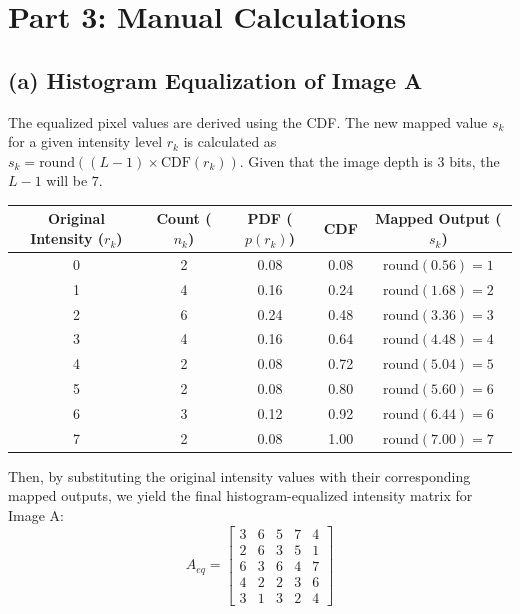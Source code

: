 \documentclass{article}
\begin{document}
\section{Part 3: Manual Calculations}

\subsection*{(a) Histogram Equalization of Image A}
The equalized pixel values are derived using the CDF. The new mapped value $s_k$ for a 
given intensity level $r_k$ is calculated as $s_k = \text{round}((L-1) \times \text{CDF}(r_k))$.
Given that the image depth is 3 bits, the $L-1$ will be $7$.

\begin{table}[H]
    \centering
    \renewcommand{\arraystretch}{1.2}
    \begin{tabular}{|c|c|c|c|c|}
        \hline
        \textbf{Original Intensity ($r_k$)} & \textbf{Count ($n_k$)} & \textbf{PDF ($p(r_k)$)} & \textbf{CDF} & \textbf{Mapped Output ($s_k$)} \\
        \hline
        0 & 2 & 0.08 & 0.08 & $\text{round}(0.56) = 1$ \\
        1 & 4 & 0.16 & 0.24 & $\text{round}(1.68) = 2$ \\
        2 & 6 & 0.24 & 0.48 & $\text{round}(3.36) = 3$ \\
        3 & 4 & 0.16 & 0.64 & $\text{round}(4.48) = 4$ \\
        4 & 2 & 0.08 & 0.72 & $\text{round}(5.04) = 5$ \\
        5 & 2 & 0.08 & 0.80 & $\text{round}(5.60) = 6$ \\
        6 & 3 & 0.12 & 0.92 & $\text{round}(6.44) = 6$ \\
        7 & 2 & 0.08 & 1.00 & $\text{round}(7.00) = 7$ \\
        \hline
    \end{tabular}
\end{table}

Then, by substituting the original intensity values with their corresponding mapped outputs, we yield the final histogram-equalized intensity matrix for Image A:
\[
A_{eq} = 
\begin{bmatrix}
    3 & 6 & 5 & 7 & 4 \\
    2 & 6 & 3 & 5 & 1 \\
    6 & 3 & 6 & 4 & 7 \\
    4 & 2 & 2 & 3 & 6 \\
    3 & 1 & 3 & 2 & 4 
\end{bmatrix}
\]
\end{document}
